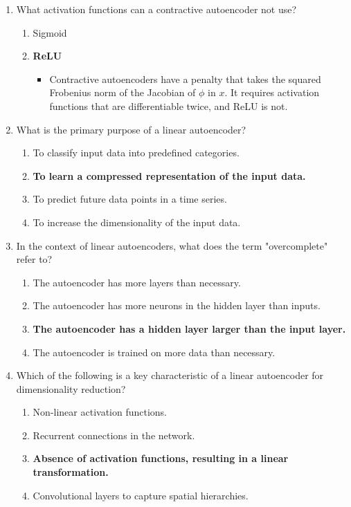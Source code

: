 \documentclass{report}
\numberwithin{equation}{section}
\begin{document}
\begin{enumerate}
\begin{enumerate}[label=\alph*.]
    \end{enumerate}
    \item What activation functions can a contractive autoencoder not use?
    \begin{enumerate}[label=\alph*.]
        \item Sigmoid
        \item \textbf{ReLU}
        \begin{itemize}
            \item Contractive autoencoders have a penalty that takes the squared Frobenius norm of the Jacobian of $\phi$ in $x$. It requires activation functions that are differentiable twice, and ReLU is not.
        \end{itemize}
    \end{enumerate}
\item What is the primary purpose of a linear autoencoder?
\begin{enumerate}[label=\alph*.]
    \item To classify input data into predefined categories.
    \item \textbf{To learn a compressed representation of the input data.}
    \item To predict future data points in a time series.
    \item To increase the dimensionality of the input data.
\end{enumerate}

\item In the context of linear autoencoders, what does the term "overcomplete" refer to?
\begin{enumerate}[label=\alph*.]
    \item The autoencoder has more layers than necessary.
    \item The autoencoder has more neurons in the hidden layer than inputs.
    \item \textbf{The autoencoder has a hidden layer larger than the input layer.}
    \item The autoencoder is trained on more data than necessary.
\end{enumerate}

\item Which of the following is a key characteristic of a linear autoencoder for dimensionality reduction?
\begin{enumerate}[label=\alph*.]
    \item Non-linear activation functions.
    \item Recurrent connections in the network.
    \item \textbf{Absence of activation functions, resulting in a linear transformation.}
    \item Convolutional layers to capture spatial hierarchies.
\end{enumerate}
\end{enumerate}
\end{document}
